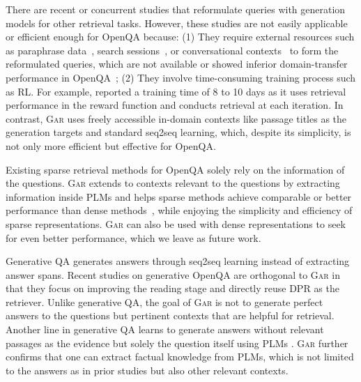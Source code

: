 \documentclass[11pt,a4paper]{article}
\newcommand{\ours}{\textsc{Gar}\xspace}
\begin{document}
There are recent or concurrent studies \cite{nogueira-cho-2017-task,zaiem2019sequence,yu2020few,vakulenko2020question,lin2020query} that reformulate queries with generation models for other retrieval tasks.
However, these studies are not easily applicable or efficient enough for OpenQA because: (1) They require external resources such as paraphrase data~\cite{zaiem2019sequence}, search sessions~\cite{yu2020few}, or conversational contexts~\cite{lin2020query,vakulenko2020question} to form the reformulated queries, which are not available or showed inferior domain-transfer performance in OpenQA~\cite{zaiem2019sequence};  (2) They involve time-consuming training process such as RL. For example, \citet{nogueira-cho-2017-task} reported a training time of 8 to 10 days as it uses retrieval performance in the reward function and conducts retrieval at each iteration.
In contrast, \ours uses freely accessible in-domain contexts like passage titles as the generation targets and standard seq2seq learning, which, despite its simplicity, is not only more efficient but effective for OpenQA.


Existing sparse retrieval methods for OpenQA \cite{chen-etal-2017-reading} solely rely on the information of the questions.
\ours extends to contexts relevant to the questions by extracting information inside PLMs and helps sparse methods achieve comparable or better performance than dense methods~\cite{guu2020realm,karpukhin2020dense}, while enjoying the simplicity and efficiency of sparse representations.
\ours can also be used with dense representations to seek for even better performance, which we leave as future work. 


Generative QA generates answers through seq2seq learning instead of extracting answer spans.
Recent studies on generative OpenQA \cite{lewis2020retrieval,min2020ambigqa,izacard2020leveraging} are orthogonal to \ours in that they focus on improving the reading stage and directly reuse DPR \cite{karpukhin2020dense} as the retriever.  
Unlike generative QA, the goal of \ours is not to generate perfect answers to the questions but pertinent contexts that are helpful for retrieval.
Another line in generative QA learns to generate answers without relevant passages as the evidence but solely the question itself using PLMs \cite{roberts2020much,brown2020language}. 
\ours further confirms that one can extract factual knowledge from PLMs, which is not limited to the answers as in prior studies but also other relevant contexts.
\end{document}
